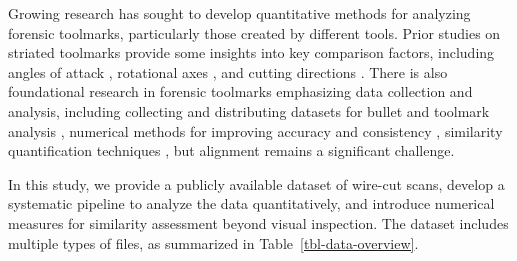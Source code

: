 \documentclass[fleqn,10pt]{wlscirep}
\begin{document}
Growing research has sought to develop quantitative methods for
analyzing forensic toolmarks, particularly those created by different
tools. Prior studies on striated toolmarks provide some insights into
key comparison factors, including angles of attack
\citep{baikerToolmarkVariabilityQuality2015a}, rotational axes
\citep{garciaInfluenceAxialRotation2017}, and cutting directions
\citep{cuellarAlgorithmForensicToolmark2024}. There is also foundational
research in forensic toolmarks emphasizing data collection and analysis,
including collecting and distributing datasets for bullet and toolmark
analysis
\citep{maNISTBulletSignature2004, zhengNISTBallisticsToolmark2016},
numerical methods for improving accuracy and consistency
\citep{chuAutomaticIdentificationBullet2013, vorburgerApplicationsCrosscorrelationFunctions2011},
similarity quantification techniques
\citep{hareAutomaticMatchingBullet2017, juJournalOpenSourceImplementation2022},
but alignment remains a significant challenge.

In this study, we provide a publicly available dataset of wire-cut
scans, develop a systematic pipeline to analyze the data quantitatively,
and introduce numerical measures for similarity assessment beyond visual
inspection. The dataset includes multiple types of files, as summarized
in Table~\ref{tbl-data-overview}.
\end{document}
